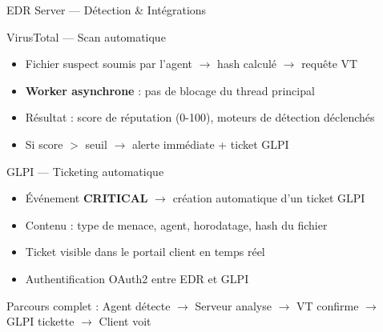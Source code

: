 \documentclass[xcolor=dvipsnames, aspectratio=169, 10pt]{beamer}
\newcommand{\bitem}{\item[$\bullet$]}
\begin{document}
\begin{frame}{EDR Server — Détection \& Intégrations}
  \begin{block}{VirusTotal — Scan automatique}
    \begin{itemize}
      \bitem Fichier suspect soumis par l'agent $\rightarrow$ hash calculé $\rightarrow$ requête VT
      \bitem \textbf{Worker asynchrone} : pas de blocage du thread principal
      \bitem Résultat : score de réputation (0-100), moteurs de détection déclenchés
      \bitem Si score $>$ seuil $\rightarrow$ alerte immédiate + ticket GLPI
    \end{itemize}
  \end{block}
  \vspace{0.2cm}
  \begin{block}{GLPI — Ticketing automatique}
    \begin{itemize}
      \bitem Événement \textbf{CRITICAL} $\rightarrow$ création automatique d'un ticket GLPI
      \bitem Contenu : type de menace, agent, horodatage, hash du fichier
      \bitem Ticket visible dans le portail client en temps réel
      \bitem Authentification OAuth2 entre EDR et GLPI
    \end{itemize}
  \end{block}
  \vspace{0.2cm}
  \begin{exampleblock}{Parcours complet : Agent détecte $\rightarrow$ Serveur analyse $\rightarrow$ VT confirme $\rightarrow$ GLPI tickette $\rightarrow$ Client voit}
  \end{exampleblock}
\end{frame}
\end{document}
